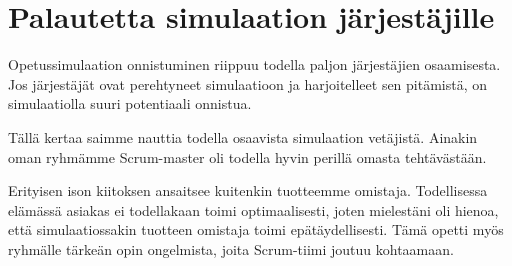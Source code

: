 \documentclass[a4paper]{article}
\begin{document}
\section{Palautetta simulaation järjestäjille}

Opetussimulaation onnistuminen riippuu todella paljon järjestäjien osaamisesta. Jos järjestäjät ovat perehtyneet simulaatioon ja harjoitelleet sen pitämistä, on simulaatiolla suuri potentiaali onnistua.

Tällä kertaa saimme nauttia todella osaavista simulaation vetäjistä. Ainakin oman ryhmämme Scrum-master oli todella hyvin perillä omasta tehtävästään.

Erityisen ison kiitoksen ansaitsee kuitenkin tuotteemme omistaja. Todellisessa elämässä asiakas ei todellakaan toimi optimaalisesti, joten mielestäni oli hienoa, että simulaatiossakin tuotteen omistaja toimi epätäydellisesti. Tämä opetti myös ryhmälle tärkeän opin ongelmista, joita Scrum-tiimi joutuu kohtaamaan.



\end{document}
